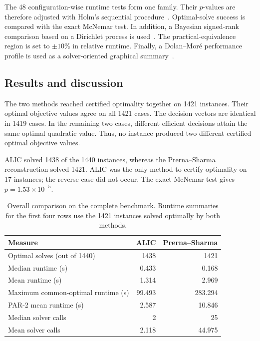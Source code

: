 The 48 configuration-wise runtime tests form one family. Their $p$-values
are therefore adjusted with Holm's sequential procedure~\cite{holm1979}.
Optimal-solve success is compared with the exact McNemar test. In
addition, a Bayesian signed-rank comparison based on a Dirichlet process
is used~\cite{benavoli2014}. The practical-equivalence region is set to
$\pm10\%$ in relative runtime. Finally, a Dolan--Mor\'e performance
profile is used as a solver-oriented graphical summary~\cite{dolanMore2002}.

\subsection{Results and discussion}
\label{subsec:results-discussion}

The two methods reached certified optimality together on 1421 instances.
Their optimal objective values agree on all 1421 cases. The decision
vectors are identical in 1419 cases. In the remaining two cases, different
efficient decisions attain the same optimal quadratic value. Thus, no
instance produced two different certified optimal objective values.

ALIC solved 1438 of the 1440 instances, whereas the Prerna--Sharma
reconstruction solved 1421. ALIC was the only method to certify optimality
on 17 instances; the reverse case did not occur. The exact McNemar test
gives $p=1.53\times10^{-5}$.

\begin{table}[t]
\centering
\caption{Overall comparison on the complete benchmark. Runtime summaries
for the first four rows use the 1421 instances solved optimally by both
methods.}
\label{tab:overall-results}
\small
\begin{tabular}{lrr}
\toprule
Measure & ALIC & Prerna--Sharma\\
\midrule
Optimal solves (out of 1440) & 1438 & 1421\\
Median runtime (s) & 0.433 & 0.168\\
Mean runtime (s) & 1.314 & 2.969\\
Maximum common-optimal runtime (s) & 99.493 & 283.294\\
PAR-2 mean runtime (s) & 2.587 & 10.846\\
Median solver calls & 2 & 25\\
Mean solver calls & 2.118 & 44.975\\
\bottomrule
\end{tabular}
\end{table}

